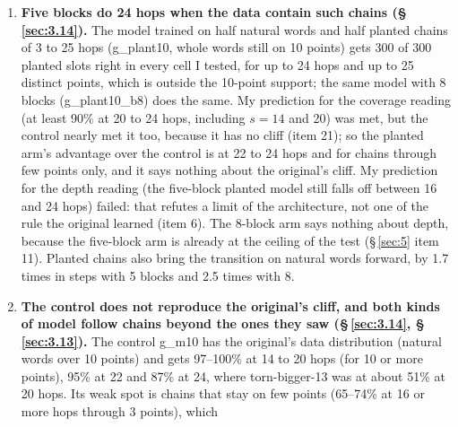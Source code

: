 \documentclass[paper=a4,fontsize=11pt,DIV=11,parskip=half,headings=small,numbers=noendperiod]{scrartcl}
\DeclareRobustCommand{\lead}[1]{\textsf{\bfseries\color{accent}#1}}
\DeclareRobustCommand{\code}[1]{{\fontseries{m}\ttfamily #1}}
\begin{document}
\begin{enumerate}
  80 (elementary model); the deepest heads of the elementary model matter only for long chains (block 4 head 1:
  1, 27 and 41 points lost at $L=12$, 40 and 80). (d) At the query position the heads read fixed ranges of word
  positions and pick chain letters within them (elementary model, $L=80$: block 4 head 0 reads the last 12
  letters, block 5 head 1 positions 72 to 83); I first read this as a rule about hop number, which was wrong
  (\S\,\ref{sec:5} item 10). (e) I did not find how 80 hops are composed: the largest offsets are about 10 to 12
  hops, and the probe cannot read the answer from the letters that block 5 reads. One head at a time cannot see
  redundancy, and attention is not causal.
\item \lead{Five blocks do 24 hops when the data contain such chains (\S\,\ref{sec:3.14}).} The model trained on
  half natural words and half planted chains of 3 to 25 hops (\code{g\_\allowbreak{}plant10}, whole words still
  on 10 points) gets 300 of 300 planted slots right in every cell I tested, for up to 24 hops and up to 25
  distinct points, which is outside the 10-point support; the same model with 8 blocks
  (\code{g\_\allowbreak{}plant10\_\allowbreak{}b8}) does the same. My prediction for the coverage reading (at
  least 90\% at 20 to 24 hops, including $s=14$ and 20) was met, but the control nearly met it too, because it
  has no cliff (item 21); so the planted arm’s advantage over the control is at 22 to 24 hops and for chains
  through few points only, and it says nothing about the original’s cliff. My prediction for the depth reading
  (the five-block planted model still falls off between 16 and 24 hops) failed: that refutes a limit of the
  architecture, not one of the rule the original learned (item 6). The 8-block arm says nothing about depth,
  because the five-block arm is already at the ceiling of the test (\S\,\ref{sec:5} item 11). Planted chains
  also bring the transition on natural words forward, by 1.7 times in steps with 5 blocks and 2.5 times with 8.
\item \lead{The control does not reproduce the original’s cliff, and both kinds of model follow chains beyond
  the ones they saw (\S\,\ref{sec:3.14}, \S\,\ref{sec:3.13}).} The control \code{g\_\allowbreak{}m10} has the
  original’s data distribution (natural words over 10 points) and gets 97–100\% at 14 to 20 hops (for 10 or more
  points), 95\% at 22 and 87\% at 24, where \code{torn-\allowbreak{}bigger-\allowbreak{}13} was at about 51\% at
  20 hops. Its weak spot is chains that stay on few points (65–74\% at 16 or more hops through 3 points), which

\end{enumerate}
\end{document}
